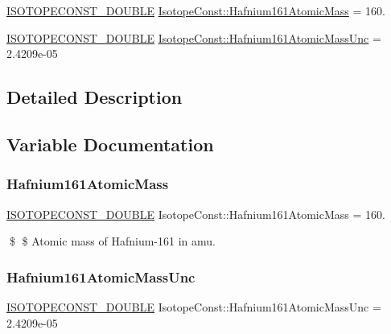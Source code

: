 \begin{DoxyCompactItemize}
\item 
\mbox{\hyperlink{group___isotope_const-_macros_ga8f45a7272ce02c0b4c65c44636ed719a}{I\+S\+O\+T\+O\+P\+E\+C\+O\+N\+S\+T\+\_\+\+D\+O\+U\+B\+LE}} \mbox{\hyperlink{group___isotope_const-_hafnium-_hf161_ga664a360f11fcacd8ac5fe0d5a668b5bc}{Isotope\+Const\+::\+Hafnium161\+Atomic\+Mass}} = 160.
\item 
\mbox{\hyperlink{group___isotope_const-_macros_ga8f45a7272ce02c0b4c65c44636ed719a}{I\+S\+O\+T\+O\+P\+E\+C\+O\+N\+S\+T\+\_\+\+D\+O\+U\+B\+LE}} \mbox{\hyperlink{group___isotope_const-_hafnium-_hf161_gaaaa7b1a5bfe4fbf7c64efe74f6ea901f}{Isotope\+Const\+::\+Hafnium161\+Atomic\+Mass\+Unc}} = 2.\+4209e-\/05
\end{DoxyCompactItemize}


\subsection{Detailed Description}


\subsection{Variable Documentation}
\mbox{\label{group___isotope_const-_hafnium-_hf161_ga664a360f11fcacd8ac5fe0d5a668b5bc}} 
\subsubsection{\texorpdfstring{Hafnium161\+Atomic\+Mass}{Hafnium161AtomicMass}}
{\footnotesize\ttfamily \mbox{\hyperlink{group___isotope_const-_macros_ga8f45a7272ce02c0b4c65c44636ed719a}{I\+S\+O\+T\+O\+P\+E\+C\+O\+N\+S\+T\+\_\+\+D\+O\+U\+B\+LE}} Isotope\+Const\+::\+Hafnium161\+Atomic\+Mass = 160.}

\$ \$ Atomic mass of Hafnium-\/161 in amu. \mbox{\label{group___isotope_const-_hafnium-_hf161_gaaaa7b1a5bfe4fbf7c64efe74f6ea901f}} 
\subsubsection{\texorpdfstring{Hafnium161\+Atomic\+Mass\+Unc}{Hafnium161AtomicMassUnc}}
{\footnotesize\ttfamily \mbox{\hyperlink{group___isotope_const-_macros_ga8f45a7272ce02c0b4c65c44636ed719a}{I\+S\+O\+T\+O\+P\+E\+C\+O\+N\+S\+T\+\_\+\+D\+O\+U\+B\+LE}} Isotope\+Const\+::\+Hafnium161\+Atomic\+Mass\+Unc = 2.\+4209e-\/05}

